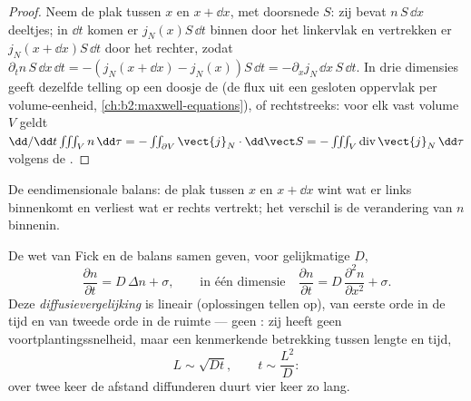 \begin{proof}
Neem de plak tussen $x$ en $x + \dd x$, met doorsnede $S$: zij bevat
$n\,S\,\dd x$ deeltjes; in $\dd t$ komen er $j_N(x)S\,\dd t$ binnen door het
linkervlak en vertrekken er $j_N(x + \dd x)S\,\dd t$ door het rechter, zodat
$\partial_t n\,S\,\dd x\,\dd t = -(j_N(x+\dd x) - j_N(x))S\,\dd t =
-\partial_x j_N\,\dd x\,S\,\dd t$.
In drie dimensies geeft dezelfde telling op
een doosje de  (de flux uit een gesloten oppervlak per
volume-eenheid, \cref{ch:b2:maxwell-equations}), of rechtstreeks: voor elk vast
volume $V$ geldt
$\dd/\dd t \iiint_V n\,\dd\tau = -\iint_{\partial V}
\vect{j}_N\cdot\dd\vect S = -\iiint_V \operatorname{div}\vect{j}_N\,\dd\tau$
volgens de .
\end{proof}

\begin{omfigure}

{\small De eendimensionale balans: de plak tussen $x$ en $x + \dd
x$ wint
wat er links binnenkomt en verliest wat er rechts vertrekt;
het verschil is de verandering van $n$ binnenin.}
\end{omfigure}

\begin{theorem}[Diffusievergelijking]\label{thm:b2:particle-diffusion:equation}
De wet van Fick en de balans samen geven, voor gelijkmatige $D$,
\[
\frac{\partial n}{\partial t} = D\,\Delta n + \sigma ,
\qquad\text{in één dimensie}\quad
\frac{\partial n}{\partial t} = D\,\frac{\partial^2 n}{\partial x^2} + \sigma .
\]
Deze \emph{diffusievergelijking} is lineair
(oplossingen tellen op), van eerste orde in de tijd en van tweede orde in de ruimte
--- geen : zij heeft geen voortplantingssnelheid, maar een
kenmerkende betrekking tussen lengte en tijd,
\[
L \sim \sqrt{D t}, \qquad t \sim \frac{L^2}{D} :
\]
over twee keer de afstand diffunderen duurt vier keer zo lang.
\end{theorem}

